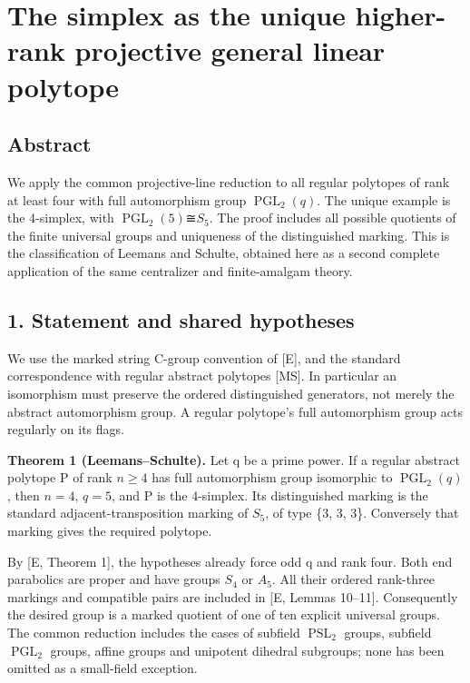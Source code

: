\documentclass[
  11pt,
  a4paper,
]{article}
\author{}
\date{}
\begin{document}
\section{The simplex as the unique higher-rank projective general linear
polytope}\label{the-simplex-as-the-unique-higher-rank-projective-general-linear-polytope}

\subsection{Abstract}\label{abstract}

We apply the common projective-line reduction to all regular polytopes
of rank at least four with full automorphism group
\(\operatorname{PGL}_2(q)\). The unique example is the 4-simplex, with
\(\operatorname{PGL}_2(5)\)≅\(S_5\). The proof includes all possible
quotients of the finite universal groups and uniqueness of the
distinguished marking. This is the classification of Leemans and
Schulte, obtained here as a second complete application of the same
centralizer and finite-amalgam theory.

\subsection{1. Statement and shared
hypotheses}\label{statement-and-shared-hypotheses}

We use the marked string C-group convention of {[}E{]}, and the standard
correspondence with regular abstract polytopes {[}MS{]}. In particular
an isomorphism must preserve the ordered distinguished generators, not
merely the abstract automorphism group. A regular polytope's full
automorphism group acts regularly on its flags.

\textbf{Theorem 1 (Leemans--Schulte).} Let q be a prime power. If a
regular abstract polytope P of rank \(n\ge 4\) has full automorphism
group isomorphic to \(\operatorname{PGL}_2(q)\), then \(n=4\), \(q=5\),
and P is the 4-simplex. Its distinguished marking is the standard
adjacent-transposition marking of \(S_5\), of type \{3, 3, 3\}.
Conversely that marking gives the required polytope.

By {[}E, Theorem 1{]}, the hypotheses already force odd q and rank four.
Both end parabolics are proper and have groups \(S_4\) or \(A_5\). All
their ordered rank-three markings and compatible pairs are included in
{[}E, Lemmas 10--11{]}. Consequently the desired group is a marked
quotient of one of ten explicit universal groups. The common reduction
includes the cases of subfield \(\operatorname{PSL}_2\) groups, subfield
\(\operatorname{PGL}_2\) groups, affine groups and unipotent dihedral
subgroups; none has been omitted as a small-field exception.
\end{document}
